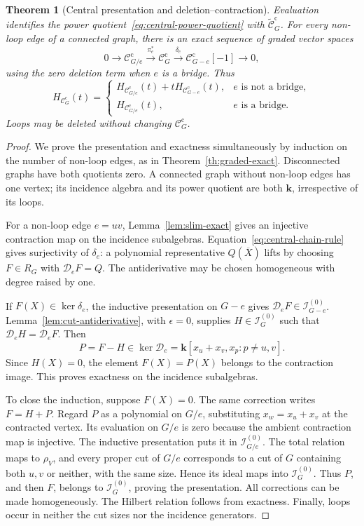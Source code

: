 \documentclass[reqno]{article}
\theoremstyle{plain} %
\newtheorem{theorem}{Theorem}[section]
\theoremstyle{definition}
\theoremstyle{remark}
\newcommand{\K} {\mathbf{k}}
\newcommand {\CC}{\mathscr{C}}
\numberwithin{equation}{section}
\begin{document}
\begin{theorem}[Central presentation and deletion--contraction]
\label{thm:central-exact}
Evaluation identifies the power quotient~\eqref{eq:central-power-quotient}
with $\widetilde{\CC}_G^{\mathrm c}$. For every non-loop edge of a
connected graph, there is an exact sequence of graded vector spaces
\begin{equation}\label{eq:central-exact}
0\longrightarrow\CC_{G/e}^{\mathrm c}
\xrightarrow{\pi_e^*}\CC_G^{\mathrm c}
\xrightarrow{\delta_e}\CC_{G-e}^{\mathrm c}[-1]
\longrightarrow0,
\end{equation}
using the zero deletion term when $e$ is a bridge. Thus
\begin{equation}\label{eq:central-hilbert-rec}
H_{\CC_G^{\mathrm c}}(t)=
\begin{cases}
H_{\CC_{G/e}^{\mathrm c}}(t)+tH_{\CC_{G-e}^{\mathrm c}}(t),
 &e\text{ is not a bridge},\\
H_{\CC_{G/e}^{\mathrm c}}(t),&e\text{ is a bridge}.
\end{cases}
\end{equation}
Loops may be deleted without changing $\CC_G^{\mathrm c}$.
\end{theorem}
\begin{proof}
We prove the presentation and exactness simultaneously by induction on
the number of non-loop edges, as in Theorem~\ref{th:graded-exact}.
Disconnected graphs have both quotients zero. A connected graph without
non-loop edges has one vertex; its incidence algebra and its power
quotient are both $\K$, irrespective of its loops.

For a non-loop edge $e=uv$, Lemma~\ref{lem:slim-exact} gives an
injective contraction map on the incidence subalgebras.
Equation~\eqref{eq:central-chain-rule} gives surjectivity of $\delta_e$:
a polynomial representative $Q(\overline X)$ lifts by choosing
$F\in R_G$ with $\mathcal D_eF=Q$. The antiderivative may be chosen
homogeneous with degree raised by one.

If $F(X)\in\ker\delta_e$, the inductive presentation on $G-e$ gives
$\mathcal D_eF\in\mathcal I_{G-e}^{(0)}$.
Lemma~\ref{lem:cut-antiderivative}, with $\epsilon=0$, supplies
$H\in\mathcal I_G^{(0)}$ such that $\mathcal D_eH=\mathcal D_eF$.
Then
\[
P=F-H\in\ker\mathcal D_e
=\K[x_u+x_v,x_p:p\ne u,v].
\]
Since $H(X)=0$, the element $F(X)=P(X)$ belongs to the contraction
image. This proves exactness on the incidence subalgebras.

To close the induction, suppose $F(X)=0$. The same correction writes
$F=H+P$. Regard $P$ as a polynomial on $G/e$, substituting
$x_w=x_u+x_v$ at the contracted vertex. Its evaluation on $G/e$ is
zero because the ambient contraction map is injective. The inductive
presentation puts it in $\mathcal I_{G/e}^{(0)}$.
The total relation maps to $\rho_V$, and every proper cut of $G/e$
corresponds to a cut of $G$ containing both $u,v$ or neither, with the
same size. Hence its ideal maps into $\mathcal I_G^{(0)}$.
Thus $P$, and then $F$, belongs to $\mathcal I_G^{(0)}$, proving the
presentation. All corrections can be made homogeneously.
The Hilbert relation follows from exactness. Finally, loops occur in
neither the cut sizes nor the incidence generators.
\end{proof}
\end{document}

